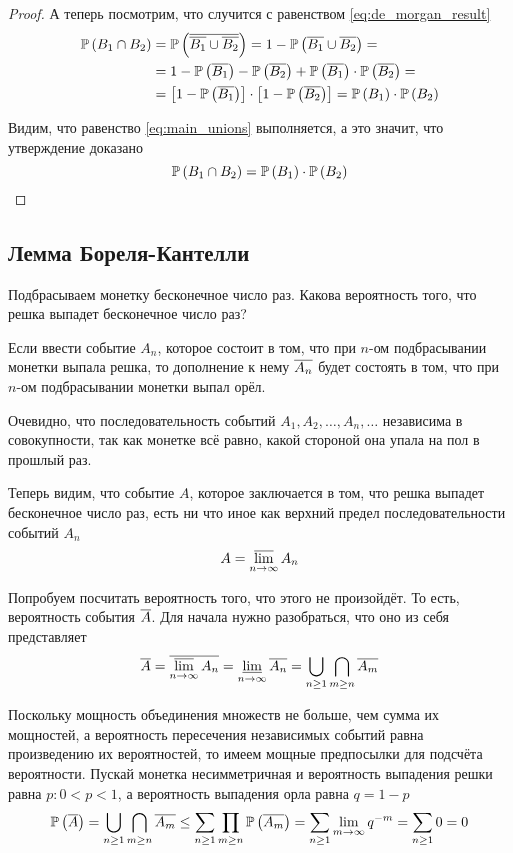 \begin{proof}
    А теперь посмотрим, что случится с равенством \eqref{eq:de_morgan_result}
    \begin{align*}
        \mathbb{P}\left( B_1\cap B_2 \right)
        &=\mathbb{P}\left( \overline{\overline{B_1}\cup \overline{B_2}} \right)
        =1-\mathbb{P}\left( {\overline{B_1}\cup \overline{B_2}} \right)=\\
        &=1-\mathbb{P}\left( \overline{B_1} \right)-\mathbb{P}\left( \overline{B_2} \right)
        +\mathbb{P}\left( \overline{B_1} \right)\cdot \mathbb{P}\left( \overline{B_2} \right)=\\
        &=\left[1-\mathbb{P}\left( \overline{B_1} \right)\right]
            \cdot\left[1-\mathbb{P}\left( \overline{B_2} \right)\right]
        =\mathbb{P}\left( B_1 \right)\cdot\mathbb{P}\left( B_2 \right)
    \end{align*}

    Видим, что равенство \eqref{eq:main_unions} выполняется,
    а это значит, что утверждение доказано
    $$\mathbb{P}\left( B_1\cap B_2 \right)=\mathbb{P}\left( B_1 \right)\cdot\mathbb{P}\left( B_2 \right)$$

\end{proof}
\subsection{Лемма Бореля-Кантелли}
    Подбрасываем монетку бесконечное число раз.
    Какова вероятность того, что решка выпадет бесконечное число раз?

    Если ввести событие $A_n$, которое состоит в том,
    что при $n$-ом подбрасывании монетки выпала решка,
    то дополнение к нему $\overline{A_n}$ будет состоять в том,
    что при $n$-ом подбрасывании монетки выпал орёл.

    Очевидно, что последовательность событий $A_1, A_2, \dots, A_n, \dots$
    независима в совокупности, так как монетке всё равно,
    какой стороной она упала на пол в прошлый раз.

    Теперь видим, что событие $A$, которое заключается в том,
    что решка выпадет бесконечное число раз, есть ни что иное как
    верхний предел последовательности событий $A_n$
    $$A=\varlimsup\limits_{n\to\infty}A_n$$

    Попробуем посчитать вероятность того, что этого не произойдёт.
    То есть, вероятность события $\overline{A}$.
    Для начала нужно разобраться, что оно из себя представляет
    $$\overline{A}=\overline{\varlimsup\limits_{n\to\infty}A_n}
        =\varliminf\limits_{n\to\infty}\overline{A_n}
        =\bigcup_{n\ge 1}\bigcap_{m\ge n}\overline{A_m}$$

    Поскольку мощность объединения множеств не больше, чем сумма их мощностей,
    а вероятность пересечения независимых событий
    равна произведению их вероятностей,
    то имеем мощные предпосылки для подсчёта вероятности.
    Пускай монетка несимметричная и вероятность выпадения решки равна $p:0<p<1$,
    а вероятность выпадения орла равна $q=1-p$
    $$\mathbb{P}\left( \overline{A} \right)=\bigcup_{n\ge 1}\bigcap_{m\ge n}\overline{A_m}
        \le \sum_{n\ge 1} \prod_{m\ge n}\mathbb{P}\left( \overline{A_m} \right)
        =\sum_{n\ge 1}\lim\limits_{m\to\infty}q^{-m}
        =\sum_{n\ge 1} 0=0$$
    
